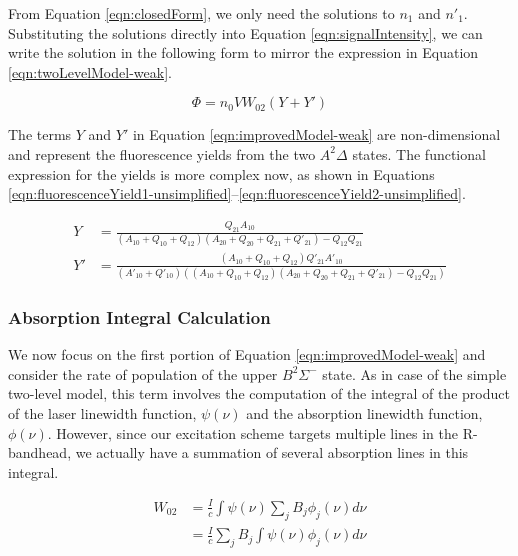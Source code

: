 From Equation \ref{eqn:closedForm}, we only need the solutions to \(n_1\) and \(n'_1\).
Substituting the solutions directly into Equation \ref{eqn:signalIntensity}, we can write the solution in the following form to mirror the expression in Equation \ref{eqn:twoLevelModel-weak}.

\begin{equation}
  \Phi = n_0VW_{02}(Y + Y')
  \label{eqn:improvedModel-weak}
\end{equation}


The terms \(Y\) and \(Y'\) in Equation \ref{eqn:improvedModel-weak} are non-dimensional and represent the fluorescence yields from the two \(A^2\Delta\) states.
The functional expression for the yields is more complex now, as shown in Equations \ref{eqn:fluorescenceYield1-unsimplified}--\ref{eqn:fluorescenceYield2-unsimplified}.

\begin{align}
  Y &= \frac{ Q_{21} A_{10} }{ ( A_{10} + Q_{10} + Q_{12} )( A_{20} + Q_{20} + Q_{21} + Q'_{21} ) - Q_{12}Q_{21} }
  \label{eqn:fluorescenceYield1-unsimplified}\\
  Y' &= \frac{ ( A_{10} + Q_{10} + Q_{12} )Q'_{21} A'_{10} }{ ( A'_{10} + Q'_{10} ) ( ( A_{10} + Q_{10} + Q_{12} )( A_{20} + Q_{20} + Q_{21} + Q'_{21} ) - Q_{12}Q_{21} ) }
  \label{eqn:fluorescenceYield2-unsimplified}
\end{align}

\subsubsection{Absorption Integral Calculation}
\label{subsubsec:improved-model-absorption-integral-calculation}

We now focus on the first portion of Equation \ref{eqn:improvedModel-weak} and consider the rate of population of the upper \(B^2\Sigma^-\) state.
As in case of the simple two-level model, this term involves the computation of the integral of the product of the laser linewidth function, \(\psi(\nu)\) and the absorption linewidth function, \(\phi(\nu)\).
However, since our excitation scheme targets multiple lines in the R-bandhead, we actually have a summation of several absorption lines in this integral.

\begin{align}
  W_{02} & = \frac{I}{c} \int \psi(\nu) \sum_j B_j \phi_j (\nu) d\nu \nonumber \\
        & = \frac{I}{c} \sum_j B_j \int \psi(\nu)\phi_j(\nu) d\nu
  \label{eqn:pumpingRate}
\end{align}

